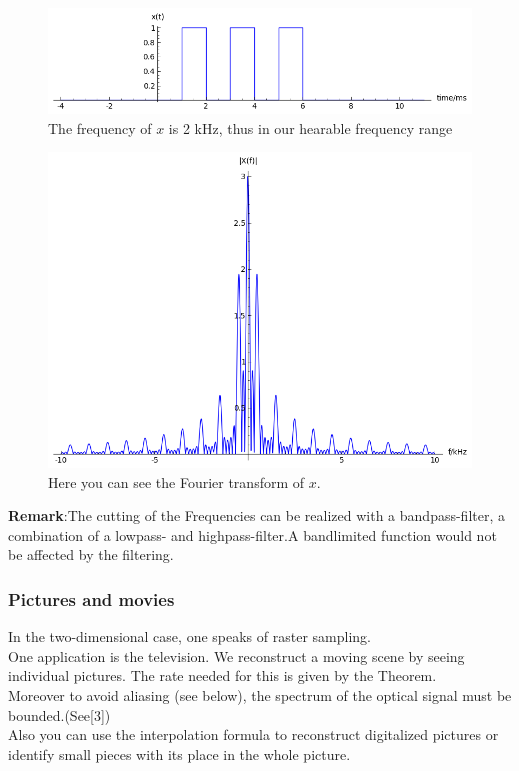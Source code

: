 \documentclass[a4paper, 11pt]{scrreprt}
\newcommand{\student}[1]{\marginnote{{\normalfont\bf #1}}}
\begin{document}
\begin{figure}[htpb]
\centering
\includegraphics[height=0.25\textwidth]{x(t).png}
\caption{The frequency of $x$ is 2 kHz, thus in our hearable frequency range}
\end{figure}
\begin{figure}[htpb]
\centering
\includegraphics[height=0.646001\textwidth]{X(f).png}
\caption{Here you can see the Fourier transform of \(x\).}

\end{figure}

\newpage
\textbf{Remark}:The cutting of the Frequencies can be realized with a bandpass-filter, a combination of a lowpass- and highpass-filter.A bandlimited function would not be affected by the filtering.\\

\student{Manuela}
\subsubsection*{Pictures and movies}
In the two-dimensional case, one speaks of raster sampling. \\
One application is the television. We reconstruct a moving scene by seeing individual pictures. The rate needed for this is given by the Theorem.\\
Moreover to avoid aliasing (see below), the spectrum of the optical signal must be bounded.(See[3])\\
Also you can use the interpolation formula to reconstruct digitalized pictures or identify small pieces with its place in the whole picture.\\
\end{document}
